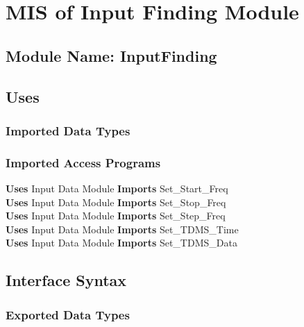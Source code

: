 \documentclass[12pt]{article}
\begin{document}
\section{MIS of Input Finding Module}
\subsection{Module Name: InputFinding}
\subsection{Uses}
\subsubsection{Imported Data Types}

\subsubsection{Imported Access Programs}
\textbf{Uses} Input Data Module \textbf{Imports} Set\_Start\_Freq\\
\textbf{Uses} Input Data Module \textbf{Imports} Set\_Stop\_Freq\\
\textbf{Uses} Input Data Module \textbf{Imports} Set\_Step\_Freq\\
\textbf{Uses} Input Data Module \textbf{Imports} Set\_TDMS\_Time\\
\textbf{Uses} Input Data Module \textbf{Imports} Set\_TDMS\_Data
\subsection{Interface Syntax}
\subsubsection{Exported Data Types}
\end{document}
